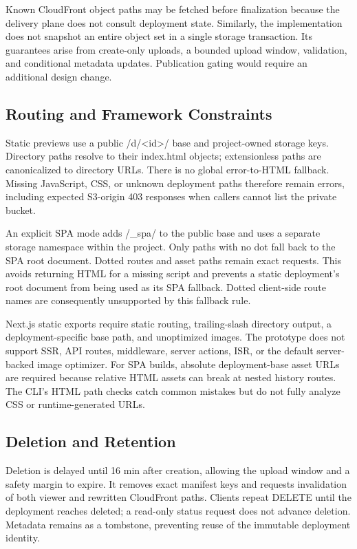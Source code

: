 \documentclass[conference,letterpaper]{IEEEtran}
\begin{document}
Known CloudFront object paths may be fetched before finalization because the delivery plane does not consult deployment state. Similarly, the implementation does not snapshot an entire object set in a single storage transaction. Its guarantees arise from create-only uploads, a bounded upload window, validation, and conditional metadata updates. Publication gating would require an additional design change.

\subsection{Routing and Framework Constraints}
Static previews use a public /d/<id>/ base and project-owned storage keys. Directory paths resolve to their index.html objects; extensionless paths are canonicalized to directory URLs. There is no global error-to-HTML fallback. Missing JavaScript, CSS, or unknown deployment paths therefore remain errors, including expected S3-origin 403 responses when callers cannot list the private bucket.

An explicit SPA mode adds /\_spa/ to the public base and uses a separate storage namespace within the project. Only paths with no dot fall back to the SPA root document. Dotted routes and asset paths remain exact requests. This avoids returning HTML for a missing script and prevents a static deployment's root document from being used as its SPA fallback. Dotted client-side route names are consequently unsupported by this fallback rule.

Next.js static exports require static routing, trailing-slash directory output, a deployment-specific base path, and unoptimized images. The prototype does not support SSR, API routes, middleware, server actions, ISR, or the default server-backed image optimizer. For SPA builds, absolute deployment-base asset URLs are required because relative HTML assets can break at nested history routes. The CLI's HTML path checks catch common mistakes but do not fully analyze CSS or runtime-generated URLs.

\subsection{Deletion and Retention}
Deletion is delayed until 16 min after creation, allowing the upload window and a safety margin to expire. It removes exact manifest keys and requests invalidation of both viewer and rewritten CloudFront paths. Clients repeat DELETE until the deployment reaches deleted; a read-only status request does not advance deletion. Metadata remains as a tombstone, preventing reuse of the immutable deployment identity.
\end{document}
